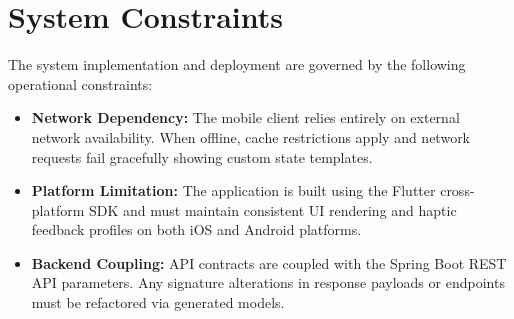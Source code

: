 \section{System Constraints}
The system implementation and deployment are governed by the following operational constraints:
\begin{itemize}
    \item \textbf{Network Dependency:} The mobile client relies entirely on external network availability. When offline, cache restrictions apply and network requests fail gracefully showing custom state templates.
    \item \textbf{Platform Limitation:} The application is built using the Flutter cross-platform SDK and must maintain consistent UI rendering and haptic feedback profiles on both iOS and Android platforms.
    \item \textbf{Backend Coupling:} API contracts are coupled with the Spring Boot REST API parameters. Any signature alterations in response payloads or endpoints must be refactored via generated models.
\end{itemize}

